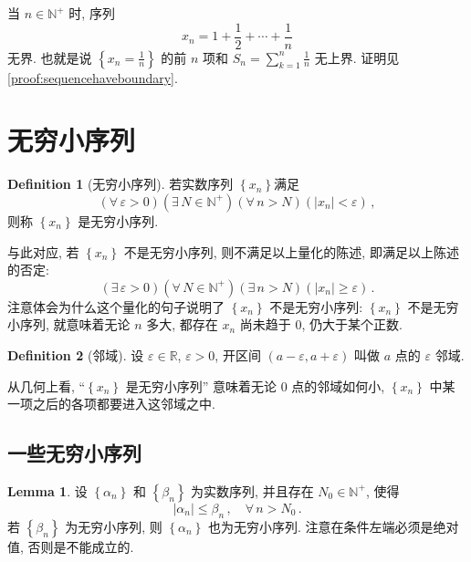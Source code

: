 \documentclass{book}
\newcommand{\Exists}{\exists\,}
\newcommand{\Any}{\forall\,}
\newcommand{\set}[1]{\left\{#1\right\}}
\newcommand{\abs}[1]{\left\lvert #1 \right\rvert}
\newcommand{\R}{\mathbb{R}}
\newcommand{\N}{\mathbb{N}}
\renewcommand{\ge}{\geqslant}
\renewcommand{\le}{\leqslant}
\numberwithin{equation}{section}
\numberwithin{figure}{section}
\theoremstyle{definition}
\newtheorem{definition}{Definition}
\newtheorem{lemma}{Lemma}[section]
\newcommand{\dq}[1]{``#1''}
\begin{document}
当 $n\in\N^+$ 时, 序列
\begin{equation*}
  x_n=1+\frac{1}{2}+\cdots+\frac{1}{n}
\end{equation*}
无界. 也就是说 $\set{x_n=\frac{1}{n}}$ 的前 $n$ 项和 $S_n=\sum_{k=1}^{n}\frac{1}{n}$ 无上界. 证明见 \cref{proof:sequencehaveboundary}.

\section{无穷小序列}
\begin{definition}[无穷小序列]
  若实数序列 $\set{x_n}$满足
  \begin{equation*}
    (\Any \varepsilon>0)(\Exists N\in\N^+)(\Any n>N)(\abs{x_n}<\varepsilon)\,,
  \end{equation*}
  则称 $\set{x_n}$ 是无穷小序列.
\end{definition}

与此对应, 若 $\set{x_n}$ 不是无穷小序列, 则不满足以上量化的陈述, 即满足以上陈述的否定:
\begin{equation*}
  (\Exists \varepsilon>0)(\Any N\in\N^+)(\Exists n>N)(\abs{x_n}\ge\varepsilon)\,.
\end{equation*}
注意体会为什么这个量化的句子说明了 $\set{x_n}$ 不是无穷小序列: $\set{x_n}$ 不是无穷小序列, 就意味着无论 $n$ 多大, 都存在 $x_n$ 尚未趋于 0, 仍大于某个正数.

\begin{definition}[邻域]
  设 $\varepsilon\in\R$, $\varepsilon>0$, 开区间 $(a-\varepsilon,a+\varepsilon)$ 叫做 $a$ 点的 $\varepsilon$ 邻域.
\end{definition}
从几何上看, \dq{$\set{x_n}$ 是无穷小序列} 意味着无论 0 点的邻域如何小, $\set{x_n}$ 中某一项之后的各项都要进入这邻域之中.

\subsection{一些无穷小序列}
\begin{lemma}\label{lem:infinitesimalsequence}
  设 $\set{\alpha_n}$ 和 $\set{\beta_n}$ 为实数序列, 并且存在 $N_0\in\N^+$, 使得
  \begin{equation*}
    \abs{\alpha_n}\le \beta_n\,,\quad\Any n>N_0\,.
  \end{equation*}
  若 $\set{\beta_n}$ 为无穷小序列, 则 $\set{\alpha_n}$ 也为无穷小序列. 注意在条件左端必须是绝对值, 否则是不能成立的.
\end{lemma}
\end{document}
